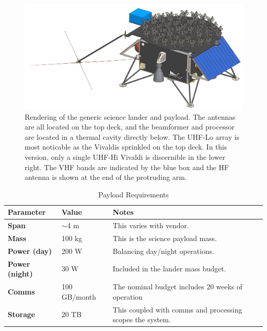 \begin{figure}
	\centering
	\includegraphics[width=\linewidth]{figures/lander_render.png}
	\caption{Rendering of the generic science lander and payload.  The antennas are all located on the top deck, and the beamformer and processor are located in a thermal cavity directly below.  The UHF-Lo array is most noticable as the Vivaldis sprinkled on the top deck.  In this version, only a single UHF-Hi Vivaldi is discernible in the lower right.  The VHF bands are indicated by the blue box and the HF antenna is shown at the end of the protruding arm. \label{fig:render}}
\end{figure}

\begin{table}
    \caption{Payload Requirements}
    \begin{tabular}{|l|l|l|} \hline
    \textbf{Parameter} & \textbf{Value} & \textbf{Notes} \\ \hline
    \textbf{Span} & $\sim$4 m & This varies with vendor. \\ \hline
    \textbf{Mass} & 100 kg & This is the science payload mass. \\ \hline
    \textbf{Power (day)} & 200 W & Balancing day/night operations. \\ \hline
    \textbf{Power (night)} & 30 W & Included in the lander mass budget. \\ \hline
    \textbf{Comms} & 100 GB/month & The nominal budget includes 20 weeks of operation \\ \hline
    \textbf{Storage} & 20 TB & This coupled with comms and processing scopes the system. \\ \hline
    \end{tabular}
    \label{tab:constraints}
\end{table}


